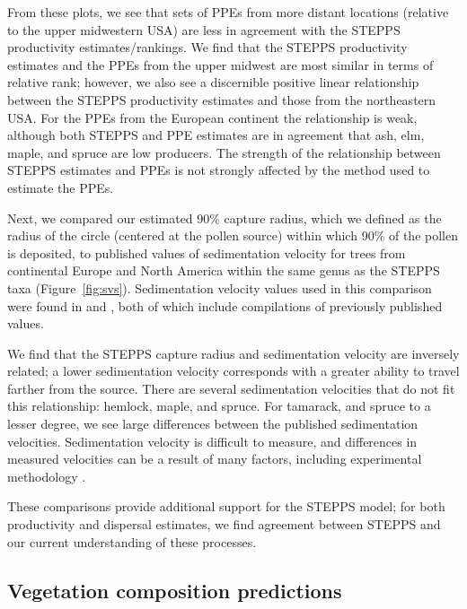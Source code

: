 \documentclass[12pt]{article}
\begin{document}
From these plots, we see that sets of PPEs from more distant locations
(relative to the upper midwestern USA) are less in agreement with the
STEPPS productivity estimates/rankings.  We find that the STEPPS
productivity estimates and the PPEs from the upper midwest are most
similar in terms of relative rank; however, we also see a discernible
positive linear relationship between the STEPPS productivity estimates
and those from the northeastern USA. For the PPEs from the European
continent the relationship is weak, although both STEPPS and PPE
estimates are in agreement that ash, elm, maple, and spruce are low
producers. The strength of the relationship between STEPPS estimates
and PPEs is not strongly affected by the method used to estimate the
PPEs.

Next, we compared our estimated 90\% capture radius, which we defined
as the radius of the circle (centered at the pollen source) within
which 90\% of the pollen is deposited, to published values of
sedimentation velocity for trees from continental Europe and North
America within the same genus as the STEPPS taxa
(Figure~\ref{fig:svs}). Sedimentation velocity values used in this
comparison were found in \citet{jackson1999pollen} and
\citet{matthias2014insights}, both of which include compilations of
previously published values.


We find that the STEPPS capture radius and sedimentation velocity are
inversely related; a lower sedimentation velocity corresponds with a
greater ability to travel farther from the source. There are several
sedimentation velocities that do not fit this relationship: hemlock,
maple, and spruce. For tamarack, and spruce to a lesser degree, we see
large differences between the published sedimentation
velocities. Sedimentation velocity is difficult to measure, and
differences in measured velocities can be a result of many
factors, including experimental methodology \citep{XXX}.

These comparisons provide additional support for the STEPPS model; for
both productivity and dispersal estimates, we find agreement between
STEPPS and our current understanding of these processes.

\subsection{Vegetation composition predictions}
\end{document}
